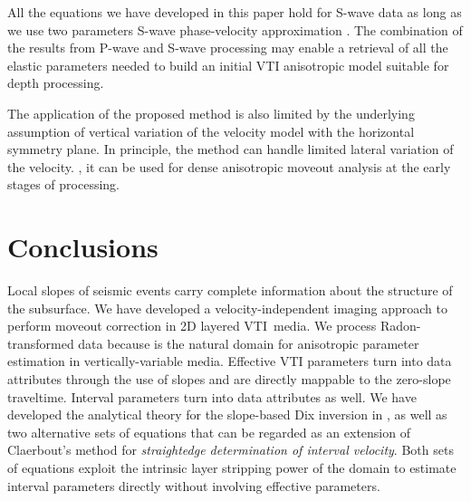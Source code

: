 All the equations we have developed in this paper hold for S-wave data
as long as we use two parameters S-wave phase-velocity
approximation \citep{stovas:2506}. The combination of the results from
P-wave and S-wave processing may enable a retrieval of all the elastic
parameters needed to build an initial VTI anisotropic model suitable
for depth processing.

The application of the proposed method is also limited by the
underlying assumption of vertical variation of the velocity model with
the horizontal symmetry plane. In principle, the method can handle
limited lateral variation of the velocity.  ,
it can be used for dense anisotropic moveout analysis at the early
stages of processing.

\section{Conclusions}

Local slopes of seismic events carry complete information about the
structure of the subsurface. We have developed a velocity-independent
\taup imaging approach to perform moveout correction in 2D layered
VTI\ media. We process Radon-transformed data because \taup is the
natural domain for anisotropic parameter estimation in
vertically-variable media.
Effective VTI parameters turn into data attributes through the use of
slopes and are directly mappable to the zero-slope
traveltime. Interval parameters turn into data attributes as well. We
have developed the analytical theory for the slope-based Dix inversion
in \taup, as well as two alternative sets of equations that can be
regarded as an extension of Claerbout's method for
\textit{straightedge determination of interval velocity}. Both sets of
equations exploit the intrinsic layer stripping power of the \taup
domain to estimate interval parameters directly without involving
effective parameters.

